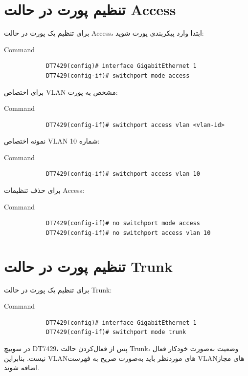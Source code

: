 \documentclass[11pt,letterpaper]{report}
\begin{document}
	\section{تنظیم پورت در حالت Access}
			برای تنظیم یک پورت در حالت Access، ابتدا وارد پیکربندی پورت
		شوید:

	\begin{latin}
		\begin{cliexample}{Command}
			\begin{verbatim}
			DT7429(config)# interface GigabitEthernet 1
			DT7429(config-if)# switchport mode access
			\end{verbatim}
		\end{cliexample}
	\end{latin}
			برای اختصاص VLAN مشخص به پورت:

	\begin{latin}
		\begin{cliexample}{Command}
			\begin{verbatim}
			DT7429(config-if)# switchport access vlan <vlan-id>
			\end{verbatim}
		\end{cliexample}
	\end{latin}
			نمونه اختصاص VLAN شماره 10:

	\begin{latin}
		\begin{cliexample}{Command}
			\begin{verbatim}
			DT7429(config-if)# switchport access vlan 10
			\end{verbatim}
		\end{cliexample}
	\end{latin}
			برای حذف تنظیمات Access:

	\begin{latin}
		\begin{cliexample}{Command}
			\begin{verbatim}
			DT7429(config-if)# no switchport mode access
			DT7429(config-if)# no switchport access vlan 10
			\end{verbatim}
		\end{cliexample}
	\end{latin}


	\section{تنظیم پورت در حالت Trunk}
			برای تنظیم یک پورت در حالت Trunk:

	\begin{latin}
		\begin{cliexample}{Command}
			\begin{verbatim}
			DT7429(config)# interface GigabitEthernet 1
			DT7429(config-if)# switchport mode trunk
			\end{verbatim}
		\end{cliexample}
	\end{latin}
			در سوییچ DT7429، پس از فعال‌کردن حالت Trunk، وضعیت
		 به‌صورت خودکار فعال نیست. بنابراین VLANهای موردنظر		باید به‌صورت صریح به فهرست VLANهای مجاز اضافه شوند.
\end{document}
